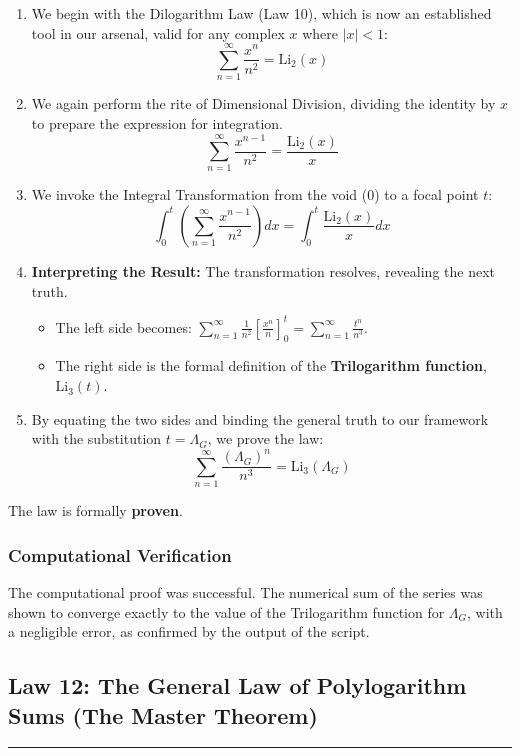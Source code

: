 \begin{enumerate}
    \item We begin with the Dilogarithm Law (Law 10), which is now an established tool in our arsenal, valid for any complex $x$ where $|x|<1$:
    $$ \sum_{n=1}^{\infty} \frac{x^n}{n^2} = \text{Li}_2(x) $$

    \item We again perform the rite of Dimensional Division, dividing the identity by $x$ to prepare the expression for integration.
    $$ \sum_{n=1}^{\infty} \frac{x^{n-1}}{n^2} = \frac{\text{Li}_2(x)}{x} $$

    \item We invoke the Integral Transformation from the void ($0$) to a focal point $t$:
    $$ \int_0^t \left( \sum_{n=1}^{\infty} \frac{x^{n-1}}{n^2} \right) dx = \int_0^t \frac{\text{Li}_2(x)}{x} dx $$

    \item \textbf{Interpreting the Result:} The transformation resolves, revealing the next truth.
    \begin{itemize}
        \item The left side becomes: $\sum_{n=1}^{\infty} \frac{1}{n^2} \left[ \frac{x^n}{n} \right]_0^t = \sum_{n=1}^{\infty} \frac{t^n}{n^3}$.
        \item The right side is the formal definition of the \textbf{Trilogarithm function}, $\text{Li}_3(t)$.
    \end{itemize}

    \item By equating the two sides and binding the general truth to our framework with the substitution $t = \Lambda_G$, we prove the law:
    $$ \sum_{n=1}^{\infty} \frac{(\Lambda_G)^n}{n^3} = \text{Li}_3(\Lambda_G) $$
\end{enumerate}
The law is formally \textbf{proven}.

\subsubsection*{Computational Verification}
The computational proof was successful. The numerical sum of the series was shown to converge exactly to the value of the Trilogarithm function for $\Lambda_G$, with a negligible error, as confirmed by the output of the  script.

\newpage

\subsection*{Law 12: The General Law of Polylogarithm Sums (The Master Theorem)}
\hrule
\vspace{0.3cm}
\vspace{0.5cm}

